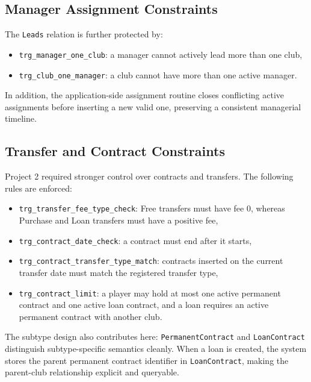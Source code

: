 \documentclass[12pt,a4paper]{article}
\begin{document}
\subsection{Manager Assignment Constraints}
The \texttt{Leads} relation is further protected by:
\begin{itemize}
    \item \texttt{trg\_manager\_one\_club}: a manager cannot actively lead more than one club,
    \item \texttt{trg\_club\_one\_manager}: a club cannot have more than one active manager.
\end{itemize}
In addition, the application-side assignment routine closes conflicting active assignments before inserting a new valid one, preserving a consistent managerial timeline.

\subsection{Transfer and Contract Constraints}
Project 2 required stronger control over contracts and transfers. The following rules are enforced:
\begin{itemize}
    \item \texttt{trg\_transfer\_fee\_type\_check}: Free transfers must have fee 0, whereas Purchase and Loan transfers must have a positive fee,
    \item \texttt{trg\_contract\_date\_check}: a contract must end after it starts,
    \item \texttt{trg\_contract\_transfer\_type\_match}: contracts inserted on the current transfer date must match the registered transfer type,
    \item \texttt{trg\_contract\_limit}: a player may hold at most one active permanent contract and one active loan contract, and a loan requires an active permanent contract with another club.
\end{itemize}

The subtype design also contributes here: \texttt{PermanentContract} and \texttt{LoanContract} distinguish subtype-specific semantics cleanly. When a loan is created, the system stores the parent permanent contract identifier in \texttt{LoanContract}, making the parent-club relationship explicit and queryable.
\end{document}
